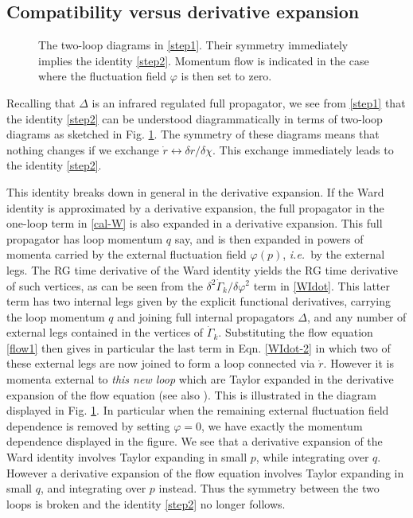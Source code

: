 \documentclass[11pt]{book} %
\newcommand\ie{\textit{i.e.}\ }
\numberwithin{equation}{chapter}
\begin{document}
\subsection{Compatibility versus derivative expansion}
\label{sec:exact-vs-derivatives}

\begin{figure}
  \begin{center}
    
  \end{center}
  \caption{
    The two-loop diagrams in \eqref{step1}.
    Their symmetry immediately implies the identity \eqref{step2}.
    Momentum flow is indicated in the case where the fluctuation field $\varphi$ is then set to zero.
  }
  \label{fig:two-loop}
\end{figure}
Recalling that $\Delta$ is an infrared regulated full propagator,
we see from \eqref{step1} that the identity \eqref{step2} can be understood diagrammatically
in terms of two-loop diagrams as sketched in Fig. \ref{fig:two-loop}.
The symmetry of these diagrams means that nothing changes if we
exchange $\dot{r}\leftrightarrow\delta r/\delta\chi$.
This exchange immediately leads to the identity \eqref{step2}.

This identity breaks down in general in the derivative expansion.
If the Ward identity is approximated by a derivative expansion,
the full propagator in the one-loop term in \eqref{cal-W} is also expanded in a derivative expansion.
This full propagator has loop momentum $q$ say,
and is then expanded in powers of momenta carried by the external fluctuation
field $\varphi(p)$, \ie by the external legs.
The RG time derivative of the Ward identity yields the RG time derivative of such vertices,
as can be seen from the $\delta^2\dot{\Gamma}_k/\delta\varphi^2$ term  in \eqref{WIdot}.
This latter term has two internal legs given by the explicit functional derivatives,
carrying the loop momentum $q$ and joining full internal propagators $\Delta$,
and any number of external legs contained in the vertices of $\dot{\Gamma}_k$.
Substituting the flow equation \eqref{flow1} then gives in particular the last term in
Eqn. \eqref{WIdot-2} in which two of these external legs are now joined to form a loop
connected via $\dot{r}$.  However it is momenta external to \emph{this new loop} which are
Taylor expanded in the derivative expansion of the flow equation
(see also \cite{Morris:1999ba, Morris:2000hm}).
This is illustrated in the diagram displayed in Fig. \ref{fig:two-loop}.
In particular when the remaining external fluctuation field dependence is removed by setting $\varphi=0$,
we have exactly the momentum dependence displayed in the figure.
We see that a derivative expansion of the Ward identity involves Taylor expanding in small $p$,
while integrating over $q$.
However a derivative expansion of the flow equation involves Taylor expanding in small $q$,
and integrating over $p$ instead.
Thus the symmetry between the two loops is broken and the identity \eqref{step2} no longer follows.
\end{document}
